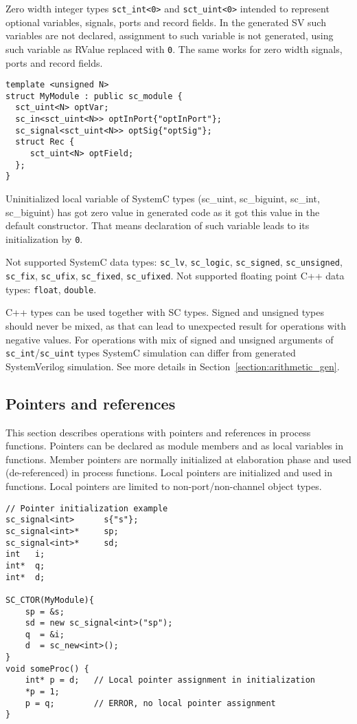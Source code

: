 Zero width integer types {\tt sct\_int<0>} and {\tt sct\_uint<0>} intended to represent optional variables, signals, ports and record fields. In the generated SV such variables are not declared, assignment to such variable is not generated, using such variable as RValue replaced with {\tt 0}. The same works for zero width signals, ports and record fields.

\begin{lstlisting}[style=mycpp]
template <unsigned N>
struct MyModule : public sc_module {
  sct_uint<N> optVar;
  sc_in<sct_uint<N>> optInPort{"optInPort"};
  sc_signal<sct_uint<N>> optSig{"optSig"};
  struct Rec {
     sct_uint<N> optField;     
  };
}
\end{lstlisting}

Uninitialized local variable of SystemC types (sc\_uint, sc\_biguint, sc\_int, sc\_biguint) has got zero value in generated code as it got this value in the default constructor.
That means declaration of such variable leads to its initialization by {\tt 0}.

Not supported SystemC data types: {\tt sc\_lv}, {\tt sc\_logic}, {\tt sc\_signed}, {\tt sc\_unsigned}, {\tt sc\_fix}, {\tt sc\_ufix}, {\tt sc\_fixed}, {\tt sc\_ufixed}. 
Not supported floating point C++ data types: {\tt float}, {\tt double}.

C++ types can be used together with SC types. Signed and unsigned types should never be mixed, as that can lead to unexpected result for operations with negative values. For operations with mix of signed and unsigned arguments of {\tt sc\_int}/{\tt sc\_uint} types SystemC simulation can differ from generated SystemVerilog simulation. See more details in Section~\ref{section:arithmetic_gen}.



\subsection{Pointers and references}

This section describes operations with pointers and references in process functions. 
Pointers can be declared as module members and as local variables in functions. Member pointers are normally initialized at elaboration phase and used (de-referenced) in process functions. Local pointers are initialized and used in functions. Local pointers are limited to non-port/non-channel object types. 

\begin{lstlisting}[style=mycpp]
// Pointer initialization example
sc_signal<int>      s{"s"};
sc_signal<int>*     sp;
sc_signal<int>*     sd;
int   i;
int*  q;
int*  d;

SC_CTOR(MyModule){
    sp = &s;
    sd = new sc_signal<int>("sp");   
    q  = &i;
    d  = sc_new<int>();
}
void someProc() {
    int* p = d;   // Local pointer assignment in initialization
    *p = 1;
    p = q;        // ERROR, no local pointer assignment   
}
\end{lstlisting}


